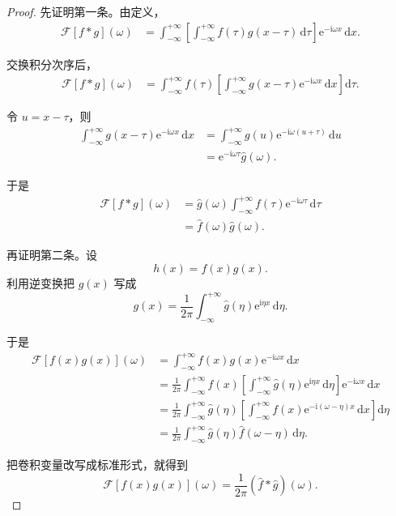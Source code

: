\begin{proof}
先证明第一条。由定义，
\begin{align}
    \mathcal{F}[f*g](\omega)
    &=
    \int_{-\infty}^{+\infty}
    \left[
        \int_{-\infty}^{+\infty}
        f(\tau)g(x-\tau)\,\mathrm{d}\tau
    \right]
    \mathrm{e}^{-\mathrm{i}\omega x}\,\mathrm{d}x.
\end{align}

交换积分次序后，
\begin{align}
    \mathcal{F}[f*g](\omega)
    &=
    \int_{-\infty}^{+\infty}
    f(\tau)
    \left[
        \int_{-\infty}^{+\infty}
        g(x-\tau)\mathrm{e}^{-\mathrm{i}\omega x}\,\mathrm{d}x
    \right]
    \mathrm{d}\tau.
\end{align}

令 $u=x-\tau$，则
\begin{align}
    \int_{-\infty}^{+\infty}
    g(x-\tau)\mathrm{e}^{-\mathrm{i}\omega x}\,\mathrm{d}x
    &=
    \int_{-\infty}^{+\infty}
    g(u)\mathrm{e}^{-\mathrm{i}\omega(u+\tau)}\,\mathrm{d}u \\
    &=
    \mathrm{e}^{-\mathrm{i}\omega\tau}\hat{g}(\omega).
\end{align}

于是
\begin{align}
    \mathcal{F}[f*g](\omega)
    &=
    \hat{g}(\omega)
    \int_{-\infty}^{+\infty}
    f(\tau)\mathrm{e}^{-\mathrm{i}\omega\tau}\,\mathrm{d}\tau \\
    &=
    \hat{f}(\omega)\hat{g}(\omega).
\end{align}

再证明第二条。设
\begin{equation}
    h(x)=f(x)g(x).
\end{equation}
利用逆变换把 $g(x)$ 写成
\begin{equation}
    g(x)=\frac{1}{2\pi}\int_{-\infty}^{+\infty}\hat{g}(\eta)\mathrm{e}^{\mathrm{i}\eta x}\,\mathrm{d}\eta.
\end{equation}

于是
\begin{align}
    \mathcal{F}[f(x)g(x)](\omega)
    &=
    \int_{-\infty}^{+\infty}
    f(x)g(x)\mathrm{e}^{-\mathrm{i}\omega x}\,\mathrm{d}x \\
    &=
    \frac{1}{2\pi}
    \int_{-\infty}^{+\infty}
    f(x)
    \left[
        \int_{-\infty}^{+\infty}
        \hat{g}(\eta)\mathrm{e}^{\mathrm{i}\eta x}\,\mathrm{d}\eta
    \right]
    \mathrm{e}^{-\mathrm{i}\omega x}\,\mathrm{d}x \\
    &=
    \frac{1}{2\pi}
    \int_{-\infty}^{+\infty}
    \hat{g}(\eta)
    \left[
        \int_{-\infty}^{+\infty}
        f(x)\mathrm{e}^{-\mathrm{i}(\omega-\eta)x}\,\mathrm{d}x
    \right]
    \mathrm{d}\eta \\
    &=
    \frac{1}{2\pi}
    \int_{-\infty}^{+\infty}
    \hat{g}(\eta)\hat{f}(\omega-\eta)\,\mathrm{d}\eta.
\end{align}

把卷积变量改写成标准形式，就得到
\begin{equation}
    \mathcal{F}[f(x)g(x)](\omega)=\frac{1}{2\pi}(\hat{f}*\hat{g})(\omega).
\end{equation}
\end{proof}

